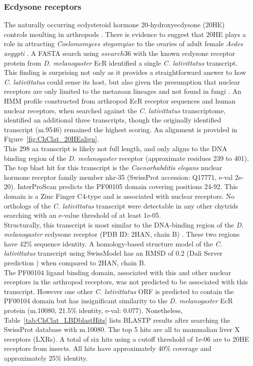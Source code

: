 \subsubsection*{Ecdysone receptors}
The naturally occurring ecdysteroid hormone 20-hydroxyecdysone (20HE) controls moulting in arthropods \cite{Thummel2002}. There is evidence to suggest that 20HE plays a role in attracting \textit{Coelomomyces stegomyiae} to the ovaries of adult female \textit{Aedes aegypti} \cite{Lucarotti1992}. A FASTA search using $ssearch36$ with the known ecdysone receptor protein from \textit{D. melanogaster} EcR \cite{Koelle1991} identified a single \textit{C. lativittatus} transcript. This finding is surprising not only as it provides a straightforward answer to how \textit{C. lativittatus} could sense its host, but also given the presumption that nuclear receptors are only limited to the metazoan lineages and not found in fungi \cite{Escriva1998}. An HMM profile constructed from arthropod EcR receptor sequences and human nuclear receptors, when searched against the \textit{C. lativittatus} transcriptome, identified an additional three transcripts, though the originally identified transcript (m.9546) remained the highest scoring. An alignment is provided in Figure~\ref{fig:ChClat_20HEalign}.\\
\indent This 298 aa transcript is likely not full length, and only aligns to the DNA binding region of the \textit{D. melanogaster} receptor (approximate residues 239 to 401). The top blast hit for this transcript is the \textit{Caenorhabditis elegans} nuclear hormone receptor family member nhr-35 (SwissProt accession: Q17771, e-val 2e-20). InterProScan \cite{Jones2014} predicts the PF00105 domain covering positions 24-92. This domain is a Zinc Finger C4-type and is associated with nuclear receptors. No orthologs of the \textit{C. lativittatus} transcript were detectable in any other chytrids searching with an e-value threshold of at least 1e-05. \\
\indent Structurally, this transcript is most similar to the DNA-binding region of the \textit{D. melanogaster} ecdysone receptor (PDB ID: 2HAN, chain B) \cite{Jakob2007}. These two regions have 42\% sequence identity. A homology-based structure model of the \textit{C. lativittatus} transcript using SwissModel \cite{Arnold2006} has an RMSD of 0.2 (Dali Server prediction \cite{Holm2010}) when compared to 2HAN, chain B. \\
\indent The PF00104 ligand binding domain, associated with this and other nuclear receptors in the arthropod receptors, was not predicted to be associated with this transcript. However one other \textit{C. lativittatus} ORF is predicted to contain the PF00104 domain but has insignificant similarity to the \textit{D. melanogaster} EcR protein (m.10080, 21.5\% identity, e-val: 0.077). Nonetheless, Table~\ref{tab:ChClat_LBDblastHits} lists BLASTP results after searching the SwissProt database with m.10080. The top 5 hits are all to mammalian liver X receptors (LXRs). A total of six hits using a cutoff threshold of 1e-06 are to 20HE receptors from insects. All hits have approximately 40\% coverage and approximately 25\% identity. \\
